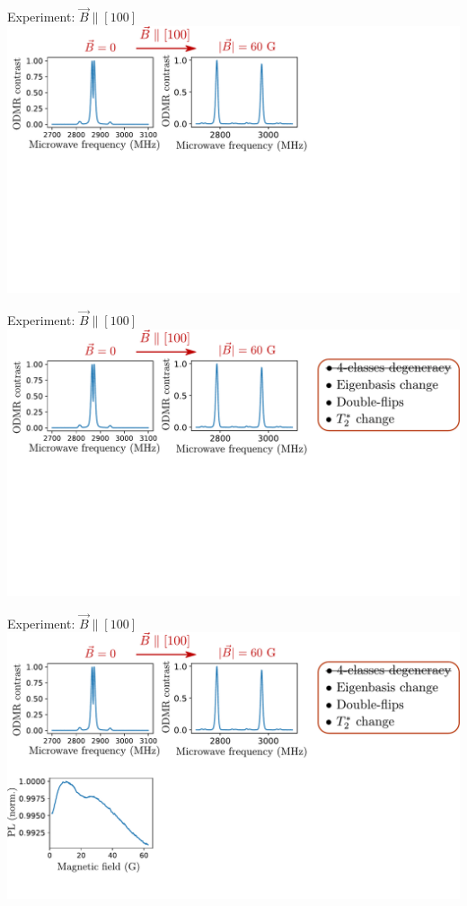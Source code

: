 \documentclass{beamer}
\begin{document}
\begin{frame}{Experiment: $\vec B \parallel [100]$}
\centering
\includegraphics[width=\textwidth,height=0.85\textheight,keepaspectratio]{Slide_T1_PL_100_f-6}
\end{frame}

\begin{frame}{Experiment: $\vec B \parallel [100]$}
\centering
\includegraphics[width=\textwidth,height=0.85\textheight,keepaspectratio]{Slide_T1_PL_100_f-5}
\end{frame}

\begin{frame}{Experiment: $\vec B \parallel [100]$}
\centering
\includegraphics[width=\textwidth,height=0.85\textheight,keepaspectratio]{Slide_T1_PL_100_f-4}
\end{frame}
\end{document}
